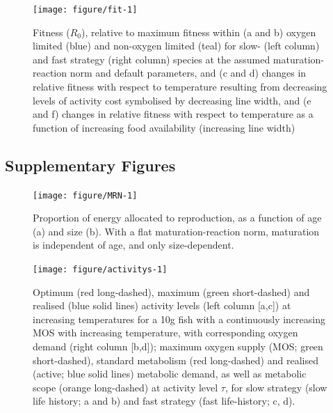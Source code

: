 \documentclass[11pt]{article}\usepackage[]{graphicx}\usepackage[]{color,soul}
\begin{document}
\begin{figure}[!ht]
{\centering 
\texttt{[image: figure/fit-1]} 
}
\caption[Fitness ($R_0$), relative to maximum fitness within (a and b) oxygen limited (blue) and non-oxygen limited (teal) for slow- (left column) and fast strategy (right column) species at the assumed maturation-reaction norm and default parameters, and (c and d) changes in relative fitness with respect to temperature resulting from decreasing levels of activity cost symbolised by decreasing line width, and (e and f) changes in relative fitness with respect to temperature as a function of increasing food availability (increasing line width)]{Fitness ($R_0$), relative to maximum fitness within (a and b) oxygen limited (blue) and non-oxygen limited (teal) for slow- (left column) and fast strategy (right column) species at the assumed maturation-reaction norm and default parameters, and (c and d) changes in relative fitness with respect to temperature resulting from decreasing levels of activity cost symbolised by decreasing line width, and (e and f) changes in relative fitness with respect to temperature as a function of increasing food availability (increasing line width)}\label{fig:fit}
\end{figure}


\FloatBarrier
\newpage
\subsection*{Supplementary Figures}
\renewcommand{\thefigure}{A\arabic{figure}}
\setcounter{figure}{0}

\begin{figure}[!ht]
{\centering 
\texttt{[image: figure/MRN-1]} 
}
\caption[Proportion of energy allocated to reproduction, as a function of age (a) and size (b)]{Proportion of energy allocated to reproduction, as a function of age (a) and size (b). With a flat maturation-reaction norm, maturation is independent of age, and only size-dependent.}\label{fig:MRN}
\end{figure}

\renewcommand{\thefigure}{S\arabic{figure}}
\setcounter{figure}{0}
\begin{figure}[!ht]
\centering
\texttt{[image: figure/activitys-1]} 
\caption{Optimum (red long-dashed), maximum (green short-dashed) and realised (blue solid lines) activity levels (left column [a,c]) at increasing temperatures for a 10g fish with a continuously increasing MOS with increasing temperature, with corresponding oxygen demand (right column [b,d]); maximum oxygen supply (MOS; green short-dashed), standard metabolism (red long-dashed) and realised (active; blue solid lines) metabolic demand, as well as metabolic scope (orange long-dashed) at activity level $\tau$, for slow strategy (slow life history; a and b) and fast strategy (fast life-history; c, d).}
\label{fig:activity-rising}
\end{figure}
\end{document}
